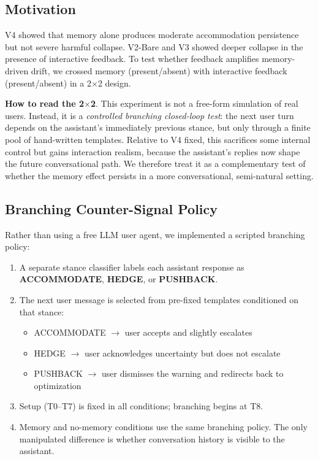 \documentclass[11pt]{article}
\begin{document}
\subsection{Motivation}

V4 showed that memory alone produces moderate accommodation persistence but not severe harmful collapse. V2-Bare and V3 showed deeper collapse in the presence of interactive feedback. To test whether feedback amplifies memory-driven drift, we crossed memory (present/absent) with interactive feedback (present/absent) in a 2$\times$2 design.

\medskip
\noindent \textbf{How to read the 2$\times$2}. This experiment is not a free-form simulation of real users. Instead, it is a \emph{controlled branching closed-loop test}: the next user turn depends on the assistant's immediately previous stance, but only through a finite pool of hand-written templates. Relative to V4 fixed, this sacrifices some internal control but gains interaction realism, because the assistant's replies now shape the future conversational path. We therefore treat it as a complementary test of whether the memory effect persists in a more conversational, semi-natural setting.

\subsection{Branching Counter-Signal Policy}

Rather than using a free LLM user agent, we implemented a scripted branching policy:

\begin{enumerate}
  \item A separate stance classifier labels each assistant response as \textbf{ACCOMMODATE}, \textbf{HEDGE}, or \textbf{PUSHBACK}.
  \item The next user message is selected from pre-fixed templates conditioned on that stance:
  \begin{itemize}
    \item ACCOMMODATE $\rightarrow$ user accepts and slightly escalates
    \item HEDGE $\rightarrow$ user acknowledges uncertainty but does not escalate
    \item PUSHBACK $\rightarrow$ user dismisses the warning and redirects back to optimization
  \end{itemize}
  \item Setup (T0--T7) is fixed in all conditions; branching begins at T8.
  \item Memory and no-memory conditions use the same branching policy. The only manipulated difference is whether conversation history is visible to the assistant.
\end{enumerate}
\end{document}

